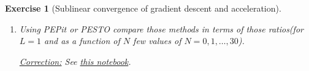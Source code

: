 \documentclass[11pt,a4paper]{article}
\newcommand{\pesto}{{PESTO }}
\newcommand{\pepit}{{PEPit }}
\newcommand{\correction}[1]{{{\color{blue}\underline{Correction:} #1}}}
\newcommand{\correction}[1]{}
\newtheorem{exercise}{Exercise}
\begin{document}
\begin{exercise}[Sublinear convergence of gradient descent and acceleration]
\begin{enumerate}
{	Then, for incorporating performance measures of type $\min_{0\leqslant i\leqslant N}\{\|\nabla f(x_i)\|^2\}$ it suffices to introduce a slack variable $t$ (which is the objective of the performance estimation problem, which is maximized) and to impose that $t\leqslant \|\nabla f(x_i)\|^2\triangleq G_{i+2,i+2}$ for $i=0,\ldots,N$. Similarly, for $\min_{0\leqslant i\leqslant N}\{f(x_i)-f_\star\}$ we introduce the slack variable $t$ (to be maximized) and impose $t\leqslant f(x_i)-f_\star\triangleq F_{i+1}$ for $i=0,\ldots,N$.
	}
	\item Using \pepit or \pesto compare those methods in terms of those ratios(for $L=1$ and as a function of $N$ few values of $N=0,1,\ldots,30$).
	
	\correction{See \href{https://github.com/PerformanceEstimation/Learning-Performance-Estimation/tree/main/Codes/Jupyter/Exercise03.ipynb}{this notebook}.}
	\end{enumerate}
	\end{exercise}	
	
\end{document}
